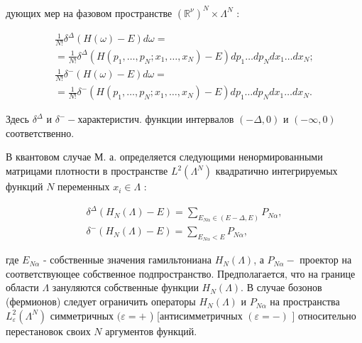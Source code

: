 \documentclass[10pt]{article}
\begin{document}
дующих мер на фазовом пространстве $\left(\mathbb{R}^{\nu}\right)^{N} \times \Lambda^{N}$ :



\[

\begin{gathered}

\frac{1}{N !} \delta^{\Delta}(H(\omega)-E) d \omega= \\

=\frac{1}{N !} \delta^{\Delta}\left(H\left(p_{1}, \ldots, p_{N} ; x_{1}, \ldots, x_{N}\right)-E\right) d p_{1} \ldots d p_{N} d x_{1} \ldots d x_{N} ; \\

\frac{1}{N !} \delta^{-}(H(\omega)-E) d \omega= \\

=\frac{1}{N !} \delta^{-}\left(H\left(p_{1}, \ldots, p_{N} ; x_{1}, \ldots, x_{N}\right)-E\right) d p_{1} \ldots d p_{N} d x_{1} \ldots d x_{N} .

\end{gathered}

\]



Здесь $\delta^{\Delta}$ и $\delta^{-}-$характеристич. функции интервалов $(-\Delta, 0)$ и $(-\infty, 0)$ соответственно.



В квантовом случае М. а. определяется следующими ненормированными матрицами плотности в пространстве $L^{2}\left(\Lambda^{N}\right)$ квадратично интегрируемых функций $N$ переменных $x_{i} \in \Lambda$ :



\[

\begin{gathered}

\delta^{\Delta}\left(H_{N}(\Lambda)-E\right)=\sum_{E_{N \alpha} \in(E-\Delta, E)} P_{N \alpha}, \\

\delta^{-}\left(H_{N}(\Lambda)-E\right)=\sum_{E_{N \alpha}<E} P_{N \alpha},

\end{gathered}

\]



где $E_{N \alpha}$ - собственные значения гамильтониана $H_{N}(\Lambda)$, а $P_{N \alpha}-$ проектор на соответствующее собственное подпространство. Предполагается, что на границе области $\Lambda$ зануляются собственные функции $H_{N}(\Lambda)$. В случае бозонов (фермионов) следует ограничить операторы $H_{N}(\Lambda)$ и $P_{N \alpha}$ на пространства $L_{\varepsilon}^{2}\left(\Lambda^{N}\right)$ симметричных $(\varepsilon=+$ ) [антисимметричных $(\varepsilon=-)$ ] относительно перестановок своих $N$ аргументов функций.
\end{document}
